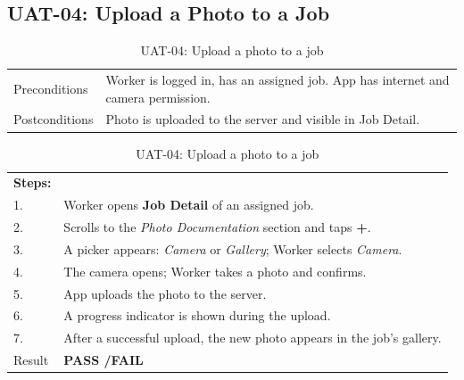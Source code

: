 \subsection*{UAT-04: Upload a Photo to a Job}
\begin{table}[H]
  \centering
  \begin{tabularx}{\textwidth}{lX}
    \toprule
    Preconditions  & Worker is logged in, has an assigned job. App has internet and camera permission. \\
    Postconditions & Photo is uploaded to the server and visible in Job Detail. \\
    \midrule
  \end{tabularx}
  \begin{tabularx}{\textwidth}{lX}
    \textbf{Steps:} & \\
    1. & Worker opens \textbf{Job Detail} of an assigned job. \\
    2. & Scrolls to the \textit{Photo Documentation} section and taps \textbf{+}. \\
    3. & A picker appears: \textit{Camera} or \textit{Gallery}; Worker selects \textit{Camera}. \\
    4. & The camera opens; Worker takes a photo and confirms. \\
    5. & App uploads the photo to the server. \\
    6. & A progress indicator is shown during the upload. \\
    7. & After a successful upload, the new photo appears in the job's gallery. \\
    \midrule
    Result & \textbf{PASS \quad/\quad FAIL} \\
    \bottomrule
  \end{tabularx}
  \caption{UAT-04: Upload a photo to a job}
\end{table}

